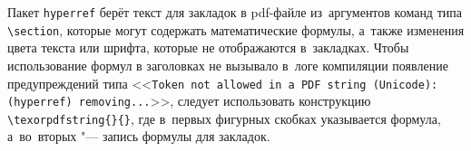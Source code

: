Пакет \texttt{hyperref} берёт текст для закладок в pdf-файле из~аргументов
команд типа \verb|\section|, которые могут содержать математические формулы,
а~также изменения цвета текста или шрифта, которые не отображаются в~закладках.
Чтобы использование формул в заголовках не вызывало в~логе компиляции появление
предупреждений типа <<\texttt{Token not allowed in~a~PDF string
(Unicode):(hyperref) removing...}>>, следует использовать конструкцию
\verb|\texorpdfstring{}{}|, где в~первых фигурных скобках указывается
формула, а~во~вторых "--- запись формулы для закладок.
